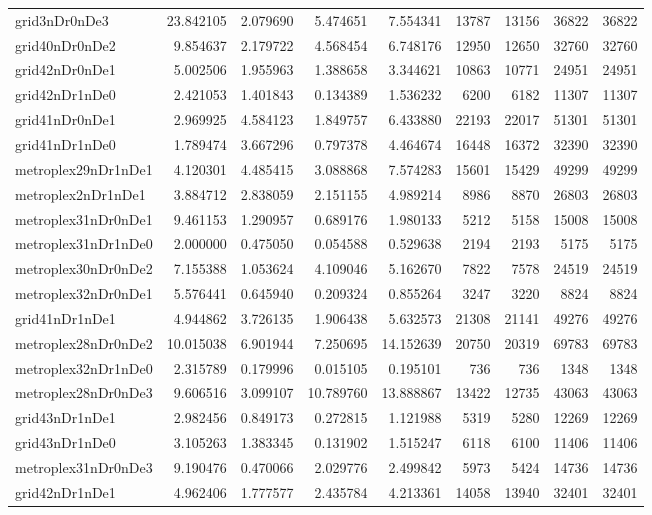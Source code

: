 \begin{longtable}{|l|r|r|r|r|r|r|r|r|}
grid3nDr0nDe3 & 23.842105 & 2.079690 & 5.474651 & 7.554341 & 13787 & 13156 & 36822 & 36822 \\
grid40nDr0nDe2 & 9.854637 & 2.179722 & 4.568454 & 6.748176 & 12950 & 12650 & 32760 & 32760 \\
grid42nDr0nDe1 & 5.002506 & 1.955963 & 1.388658 & 3.344621 & 10863 & 10771 & 24951 & 24951 \\
grid42nDr1nDe0 & 2.421053 & 1.401843 & 0.134389 & 1.536232 & 6200 & 6182 & 11307 & 11307 \\
grid41nDr0nDe1 & 2.969925 & 4.584123 & 1.849757 & 6.433880 & 22193 & 22017 & 51301 & 51301 \\
grid41nDr1nDe0 & 1.789474 & 3.667296 & 0.797378 & 4.464674 & 16448 & 16372 & 32390 & 32390 \\
metroplex29nDr1nDe1 & 4.120301 & 4.485415 & 3.088868 & 7.574283 & 15601 & 15429 & 49299 & 49299 \\
metroplex2nDr1nDe1 & 3.884712 & 2.838059 & 2.151155 & 4.989214 & 8986 & 8870 & 26803 & 26803 \\
metroplex31nDr0nDe1 & 9.461153 & 1.290957 & 0.689176 & 1.980133 & 5212 & 5158 & 15008 & 15008 \\
metroplex31nDr1nDe0 & 2.000000 & 0.475050 & 0.054588 & 0.529638 & 2194 & 2193 & 5175 & 5175 \\
metroplex30nDr0nDe2 & 7.155388 & 1.053624 & 4.109046 & 5.162670 & 7822 & 7578 & 24519 & 24519 \\
metroplex32nDr0nDe1 & 5.576441 & 0.645940 & 0.209324 & 0.855264 & 3247 & 3220 & 8824 & 8824 \\
grid41nDr1nDe1 & 4.944862 & 3.726135 & 1.906438 & 5.632573 & 21308 & 21141 & 49276 & 49276 \\
metroplex28nDr0nDe2 & 10.015038 & 6.901944 & 7.250695 & 14.152639 & 20750 & 20319 & 69783 & 69783 \\
metroplex32nDr1nDe0 & 2.315789 & 0.179996 & 0.015105 & 0.195101 & 736 & 736 & 1348 & 1348 \\
metroplex28nDr0nDe3 & 9.606516 & 3.099107 & 10.789760 & 13.888867 & 13422 & 12735 & 43063 & 43063 \\
grid43nDr1nDe1 & 2.982456 & 0.849173 & 0.272815 & 1.121988 & 5319 & 5280 & 12269 & 12269 \\
grid43nDr1nDe0 & 3.105263 & 1.383345 & 0.131902 & 1.515247 & 6118 & 6100 & 11406 & 11406 \\
metroplex31nDr0nDe3 & 9.190476 & 0.470066 & 2.029776 & 2.499842 & 5973 & 5424 & 14736 & 14736 \\
grid42nDr1nDe1 & 4.962406 & 1.777577 & 2.435784 & 4.213361 & 14058 & 13940 & 32401 & 32401 \\

\end{longtable}
